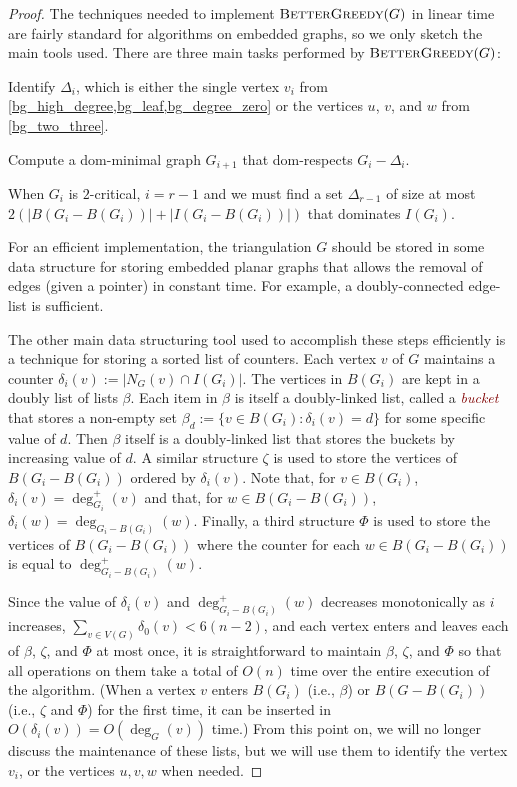 \documentclass{article}
\newcommand{\defin}[1]{\emph{\textcolor{Maroon}{#1}}}
\theoremstyle{definition}
\begin{document}
\begin{proof}
    The techniques needed to implement $\textsc{BetterGreedy}(G)$ in linear time are fairly standard for algorithms on embedded graphs, so we only sketch the main tools used.  There are three main tasks performed by $\textsc{BetterGreedy}(G)$:
    \begin{compactenum}
        \item Identify $\Delta_i$, which is either the single vertex $v_i$ from \cref{bg_high_degree,bg_leaf,bg_degree_zero} or the vertices $u$, $v$, and $w$ from \cref{bg_two_three}.
        \item Compute a dom-minimal graph $G_{i+1}$ that dom-respects $G_i-\Delta_i$.
        \item When $G_i$ is $2$-critical, $i=r-1$ and we must find a set $\Delta_{r-1}$ of size at most $2(|B(G_i-B(G_i))| + |I(G_i-B(G_i))|)$ that dominates $I(G_i)$.
    \end{compactenum}

    For an efficient implementation, the triangulation $G$ should be stored in some data structure for storing embedded planar graphs that allows the removal of edges (given a pointer) in constant time. For example, a doubly-connected edge-list \cite{muller.preparata:finding} is sufficient.

    The other main data structuring tool used to accomplish these steps efficiently is a technique for storing a sorted list of counters.  Each vertex $v$ of $G$ maintains a counter $\delta_i(v):=|N_G(v)\cap I(G_i)|$.  The vertices in $B(G_i)$ are kept in a doubly list of lists $\beta$.  Each item in $\beta$ is itself a doubly-linked list, called a \defin{bucket} that stores a non-empty set $\beta_d:=\{v\in B(G_i):\delta_i(v)=d\}$ for some specific value of $d$. Then $\beta$ itself is a doubly-linked list that stores the buckets by increasing value of $d$.  A similar structure $\zeta$ is used to store the vertices of $B(G_i-B(G_i))$ ordered by $\delta_i(v)$.  Note that, for $v\in B(G_i)$, $\delta_i(v)=\deg^+_{G_i}(v)$ and that, for $w\in B(G_i-B(G_i))$, $\delta_i(w)=\deg_{G_i-B(G_i)}(w)$.  Finally, a third structure $\Phi$ is used to store the vertices of $B(G_i-B(G_i))$ where the counter for each $w\in B(G_i-B(G_i))$ is equal to $\deg^+_{G_i-B(G_i)}(w)$.

    Since the value of $\delta_i(v)$ and $\deg^+_{G_i-B(G_i)}(w)$ decreases monotonically as $i$ increases, $\sum_{v\in V(G)}\delta_0(v)<6(n-2)$, and each vertex enters and leaves each of $\beta$, $\zeta$, and $\Phi$ at most once, it is straightforward to maintain $\beta$, $\zeta$, and $\Phi$ so that all operations on them take a total of $O(n)$ time over the entire execution of the algorithm. (When a vertex $v$ enters $B(G_i)$ (i.e., $\beta$) or $B(G-B(G_i))$ (i.e., $\zeta$ and $\Phi$) for the first time, it can be inserted in $O(\delta_i(v))=O(\deg_G(v))$ time.) From this point on, we will no longer discuss the maintenance of these lists, but we will use them to identify the vertex $v_i$, or the vertices $u,v,w$ when needed.


\end{proof}
\end{document}
